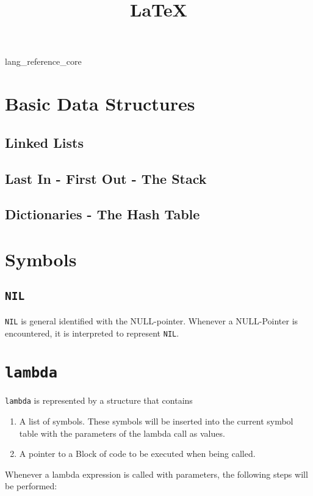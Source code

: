 \documentclass[12pt]{article}
\title{\LaTeX}
\date{}
\begin{document}


 {lang_reference_core}

\section{Basic Data Structures}

\subsection{Linked Lists}

\subsection{Last In - First Out - The Stack}

\subsection{Dictionaries - The Hash Table}


\section{Symbols}

\subsection{\texttt{NIL}}

\texttt{NIL} is general identified with the NULL-pointer. Whenever a
NULL-Pointer is encountered, it is interpreted to represent \texttt{NIL}.


\section{\texttt{lambda}}

\texttt{lambda} is represented by a structure that contains 

\begin{enumerate}
\item A list of symbols. These symbols will be inserted into the current symbol
table with the parameters of the lambda call as values. 
\item A pointer to a Block of code to be executed when being called.
\end{enumerate}

Whenever a lambda expression is called with parameters, the following steps will
be performed:
\end{document}
